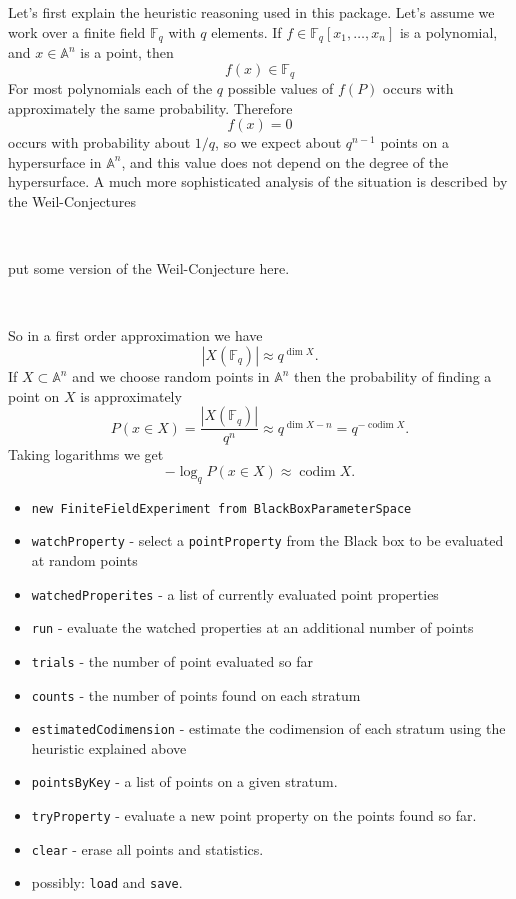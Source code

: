 \documentclass[12pt,a4paper]{amsart}
\theoremstyle{plain}
\theoremstyle{definition}
\newcommand{\FF}{\mathbb F}
\renewcommand{\AA}{\mathbb A}
\DeclareMathOperator{\codim}{codim}
\begin{document}
Let's first explain the heuristic reasoning used in this package. Let's assume we work over a finite field $\FF_q$ with $q$ elements. If $f \in \FF_q[x_1,\dots,x_n]$ is a polynomial, and $x \in \AA^n$ is a point, then
\[
	f(x) \in \FF_q
\]
For most polynomials each of the $q$ possible values of $f(P)$ occurs with approximately the same probability. Therefore 
\[
	f(x) = 0
\]
occurs with probability about $1/q$, so we expect about $q^{n-1}$ points on a hypersurface in $\AA^n$, and this value does not depend on the degree of the hypersurface. A much more sophisticated analysis of the situation is described by the Weil-Conjectures 

\

{\color{red} put some version of the Weil-Conjecture here.}

\

So in a first order approximation we have
\[
	|X(\FF_q) | \approx q^{\dim X}.
\]
If $X \subset \AA^n$ and we choose random points in $\AA^n$ then the probability of finding a point on $X$ is approximately
\[
	P(x \in X) = \frac{|X(\FF_q)|}{q^n} \approx q^{\dim X - n} = q^{-\codim X}.
\]
Taking logarithms we get
\[
	- \log_q P(x \in X) \approx \codim X.
\]

\begin{itemize}
\item {\tt new FiniteFieldExperiment from BlackBoxParameterSpace}
\item {\tt watchProperty} - select a {\tt pointProperty} from the Black box to be evaluated at random points
\item {\tt watchedProperites} - a list of currently evaluated point properties
\item {\tt run} - evaluate the watched properties at an additional number of points
\item {\tt trials} - the number of point evaluated so far
\item {\tt counts} - the number of points found on each stratum
\item {\tt estimatedCodimension} - estimate the codimension of each stratum using the heuristic explained above
\item {\tt pointsByKey} - a list of points on a given stratum. 
\item {\tt tryProperty} -  evaluate a new point property on the points found so far.
\item {\tt clear} - erase all points and statistics.
\item {\color{red} possibly:} {\tt load} and {\tt save}.
\end{itemize}
\end{document}
